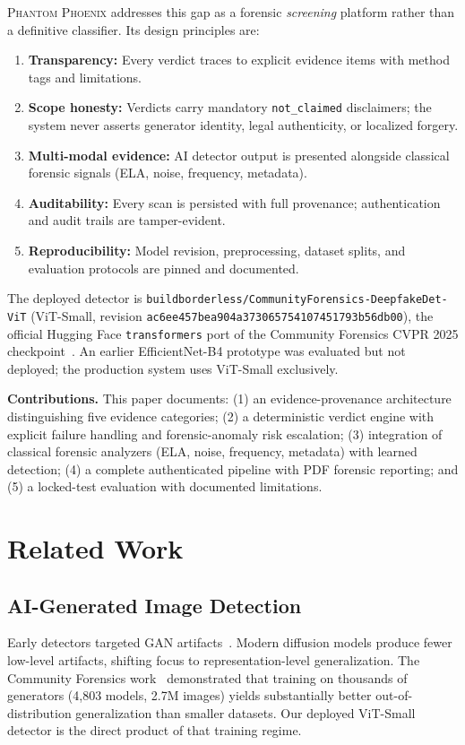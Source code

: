 \documentclass[10pt,conference,compsoc]{IEEEtran}
\begin{document}
\textsc{Phantom Phoenix} addresses this gap as a forensic \emph{screening} platform rather than a definitive classifier.
Its design principles are:

\begin{enumerate}
  \item \textbf{Transparency:} Every verdict traces to explicit evidence items with method tags and limitations.
  \item \textbf{Scope honesty:} Verdicts carry mandatory \texttt{not\_claimed} disclaimers; the system never asserts generator identity, legal authenticity, or localized forgery.
  \item \textbf{Multi-modal evidence:} AI detector output is presented alongside classical forensic signals (ELA, noise, frequency, metadata).
  \item \textbf{Auditability:} Every scan is persisted with full provenance; authentication and audit trails are tamper-evident.
  \item \textbf{Reproducibility:} Model revision, preprocessing, dataset splits, and evaluation protocols are pinned and documented.
\end{enumerate}

The deployed detector is \texttt{buildborderless/CommunityForensics-DeepfakeDet-ViT} (ViT-Small, revision \texttt{ac6ee457bea904a373065754107451793b56db00}), the official Hugging Face \texttt{transformers} port of the Community Forensics CVPR 2025 checkpoint~\cite{park2025communityforensics}.
An earlier EfficientNet-B4 prototype was evaluated but not deployed; the production system uses ViT-Small exclusively.

\textbf{Contributions.}
This paper documents: (1) an evidence-provenance architecture distinguishing five evidence categories; (2) a deterministic verdict engine with explicit failure handling and forensic-anomaly risk escalation; (3) integration of classical forensic analyzers (ELA, noise, frequency, metadata) with learned detection; (4) a complete authenticated pipeline with PDF forensic reporting; and (5) a locked-test evaluation with documented limitations.

\section{Related Work}
\label{sec:related}

\subsection{AI-Generated Image Detection}
Early detectors targeted GAN artifacts~\cite{wang2020cnn-generated, zhang2019detecting}.
Modern diffusion models produce fewer low-level artifacts, shifting focus to representation-level generalization.
The Community Forensics work~\cite{park2025communityforensics} demonstrated that training on thousands of generators (4,803 models, 2.7M images) yields substantially better out-of-distribution generalization than smaller datasets.
Our deployed ViT-Small detector is the direct product of that training regime.
\end{document}
